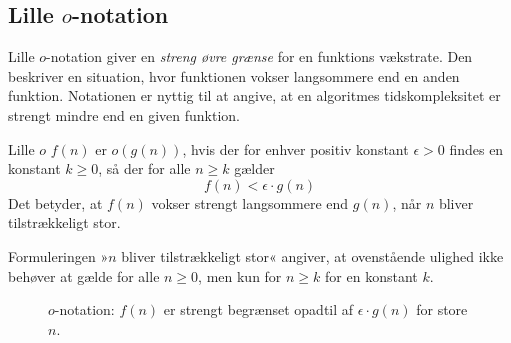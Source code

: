 \subsection*{Lille \texorpdfstring{$o$}{o}-notation}
Lille $o$-notation giver en \textit{streng øvre grænse} for en funktions vækstrate. Den beskriver en situation, hvor funktionen vokser langsommere end en anden funktion. Notationen er nyttig til at angive, at en algoritmes tidskompleksitet er strengt mindre end en given funktion.

\begin{definition}{Lille $o$}\label{def:little_o_notation}
    $f(n)$ er $o(g(n))$, hvis der for enhver positiv konstant $\epsilon > 0$ findes en konstant $k \geq 0$, så der for alle $n \geq k$ gælder
    \medskip
    \[
    f(n) < \epsilon \cdot g(n)
    \]
    \medskip
    Det betyder, at $f(n)$ vokser strengt langsommere end $g(n)$, når $n$ bliver tilstrækkeligt stor.
    
\end{definition}

Formuleringen »$n$ bliver tilstrækkeligt stor« angiver, at ovenstående ulighed ikke behøver at gælde for alle $n \geq 0$, men kun for $n \geq k$ for en konstant $k$.

\begin{figure}[htbp]
    \centering
    \caption{$o$-notation: $f(n)$ er strengt begrænset opadtil af $\epsilon \cdot g(n)$ for store $n$.}
    \label{fig:little_o_notation}
\end{figure}

